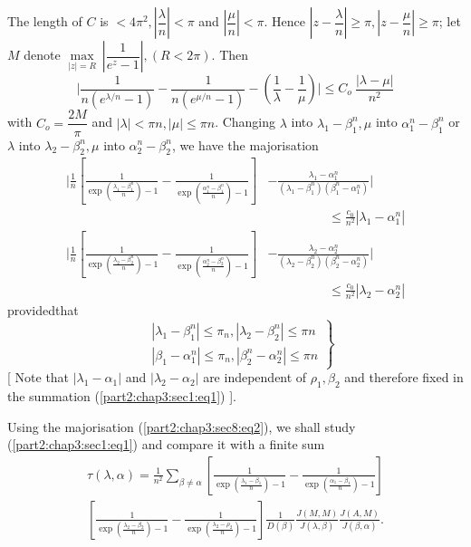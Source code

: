 The length of $C$ is $< 4 \pi^2, | \dfrac{\lambda}{n} | < \pi$ and $|
\dfrac{\mu}{n} | < \pi$. Hence $| z - \dfrac{\lambda}{n}| \ge \pi, | z
- \dfrac{\mu}{n} | \ge \pi$; let $M$ denote $\underset{|z|=R}{\max} ~
| \dfrac{1}{e^z -1}|, (R < 2 \pi)$. Then 
$$
\Big| \frac{1}{n(e^{\lambda/n}-1)} - \frac{1}{n(e^{\mu/n}-1)} -
\left(\frac{1}{\lambda} - \frac{1}{\mu}\right) \Big| \le C_o  ~
\frac{| \lambda -\mu |}{n^2} 
$$
with $C_o = \dfrac{2M}{\pi}$ and $| \lambda | < \pi n, | \mu |\le \pi
n$. Changing $\lambda$ into $\lambda_1 - \beta^n_1,\mu$ into
$\alpha^n_1 - \beta^n_1$ or $\lambda$ into $\lambda_2 - \beta^n_2,
\mu$ into $\alpha^n_2 - \beta^n_2$, we have the majorisation 
\begin{align*}
   \Bigg| \frac{1}{n} \left[ \frac{1}{\exp \left(\frac{\lambda_1 -
        \beta^n_1}{n}\right) -1} -  \frac{1}{\exp \left(\frac{\alpha^n_1 -
        \beta^n_1}{n}\right) -1}  \right] & - \frac{\lambda_1 -
    \alpha^n_1}{(\lambda_1 - \beta^n_1 ) (\beta^n_1 - \alpha^n_1 )}\Bigg|\\
  & \hspace{2cm}\leq \frac{c_0}{n^2} | \lambda_1 - \alpha^n_1 | \\ 
   \Bigg| \frac{1}{n} \left[ \frac{1}{\exp \left(\frac{\lambda_2 -
        \beta^n_2}{n}\right) -1} -  \frac{1}{\exp \left(\frac{\alpha^n_2 -
        \beta^n_2}{n}\right) -1}  \right] & - \frac{\lambda_2 -
    \alpha^n_2}{(\lambda_2 - \beta^n_2 ) (\beta^n_2 - \alpha^n_2 )} \Bigg|\\
  & \hspace{2cm} \leq \frac{c_0}{n^2} | \lambda_2 - \alpha^n_2 | 
\end{align*}
provided\pageoriginale that
\begin{equation}
  \left.
  \begin{aligned}
    & | \lambda_1 - \beta^n_1| \leq \pi_n,  |\lambda_2 - \beta^n_2 |
    \leq \pi n \\ 
    & |\beta_1 - \alpha^n_1 | \leq \pi_n,  |\beta^n_2 - \alpha^n_2 | \leq \pi n 
  \end{aligned} \tag{2}\label{part2:chap3:sec8:eq2}
  \right \} 
\end{equation}
[ Note that $|\lambda_1 - \alpha_1|$ and $|\lambda_2 - \alpha_2|$ are
  independent of $\rho_1, \beta_2$ and therefore fixed in the
  summation (\ref{part2:chap3:sec1:eq1}) ]. 

Using the majorisation (\ref{part2:chap3:sec8:eq2}), we shall study
(\ref{part2:chap3:sec1:eq1}) and compare it with
a finite sum 
\begin{multline*}
  \tau (\lambda,  \alpha ) = \frac{1}{n^2} \sum_{\beta \neq \alpha}
  \left[ \frac{1}{\exp \left(\frac{\lambda_1 - \beta_1}{n}\right) -1} -
    \frac{1}{\exp \left(\frac{\alpha_1 - \beta_1}{n}\right) -1} \right] \\ 
  \left[ \frac{1}{\exp \left(\frac{\lambda_2 - \beta_2}{n}\right) -1} -
    \frac{1}{\exp \left(\frac{\lambda_2 - \rho_2}{n}\right) -1} \right]
  \frac{1}{D(\beta )} \frac{J(M, M)}{J (\lambda, \beta )} \frac{J(A,
    M)}{J(\beta,  \alpha )}. 
\end{multline*}

